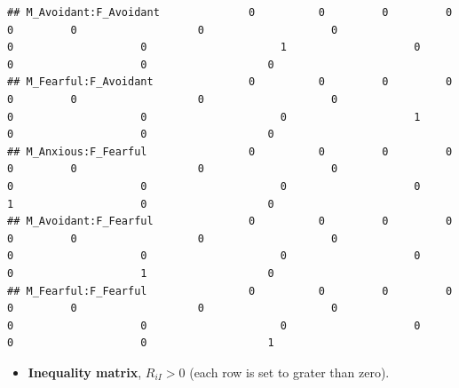 \documentclass[
]{book}
\providecommand{\tightlist}{%
  \setlength{\itemsep}{0pt}\setlength{\parskip}{0pt}}
\begin{document}
\begin{verbatim}
## M_Avoidant:F_Avoidant              0          0         0         0          0         0                   0                    0                   0                    0                     1                    0                   0                    0                   0
## M_Fearful:F_Avoidant               0          0         0         0          0         0                   0                    0                   0                    0                     0                    1                   0                    0                   0
## M_Anxious:F_Fearful                0          0         0         0          0         0                   0                    0                   0                    0                     0                    0                   1                    0                   0
## M_Avoidant:F_Fearful               0          0         0         0          0         0                   0                    0                   0                    0                     0                    0                   0                    1                   0
## M_Fearful:F_Fearful                0          0         0         0          0         0                   0                    0                   0                    0                     0                    0                   0                    0                   1
\end{verbatim}

\begin{itemize}
\tightlist
\item
  \textbf{Inequality matrix}, \(R_{iI} > 0\) (each row is set to grater than zero).
\end{itemize}
\end{document}
